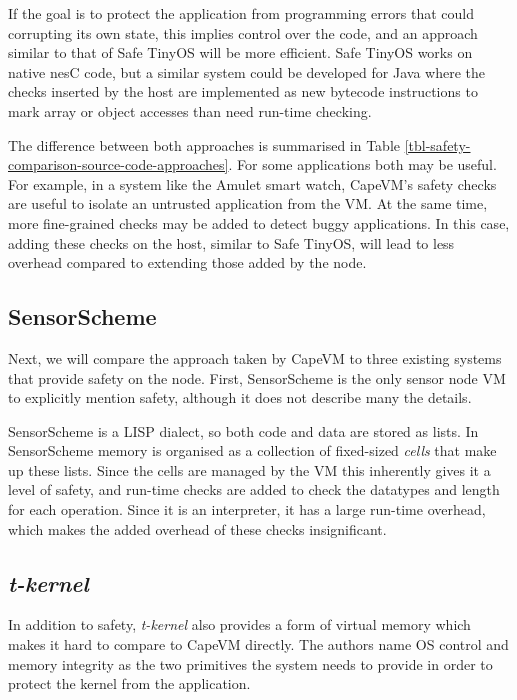 If the goal is to protect the application from programming errors that could corrupting its own state, this implies control over the code, and an approach similar to that of Safe TinyOS will be more efficient. Safe TinyOS works on native nesC code, but a similar system could be developed for Java where the checks inserted by the host are implemented as new bytecode instructions to mark array or object accesses than need run-time checking.

The difference between both approaches is summarised in Table \ref{tbl-safety-comparison-source-code-approaches}. For some applications both may be useful. For example, in a system like the Amulet smart watch, CapeVM's safety checks are useful to isolate an untrusted application from the VM. At the same time, more fine-grained checks may be added to detect buggy applications. In this case, adding these checks on the host, similar to Safe TinyOS, will lead to less overhead compared to extending those added by the node.




\subsection{SensorScheme}
Next, we will compare the approach taken by CapeVM to three existing systems that provide safety on the node. First, SensorScheme is the only sensor node VM to explicitly mention safety, although it does not describe many the details.

SensorScheme is a LISP dialect, so both code and data are stored as lists. In SensorScheme memory is organised as a collection of fixed-sized \emph{cells} that make up these lists. Since the cells are managed by the VM this inherently gives it a level of safety, and run-time checks are added to check the datatypes and length for each operation. Since it is an interpreter, it has a large run-time overhead, which makes the added overhead of these checks insignificant.




\subsection{\emph{t-kernel}}
In addition to safety, \emph{t-kernel} \cite{Gu:2005un, Gu:2006ww} also provides a form of virtual memory which makes it hard to compare to CapeVM directly. The authors name OS control and memory integrity as the two primitives the system needs to provide in order to protect the kernel from the application.

